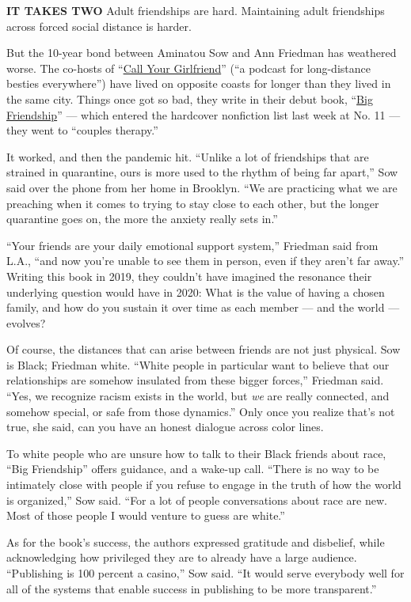 \textbf{IT TAKES TWO} Adult friendships are hard. Maintaining adult
friendships across forced social distance is harder.

But the 10-year bond between Aminatou Sow and Ann Friedman has weathered
worse. The co-hosts of ``\href{https://www.callyourgirlfriend.com/}{Call
Your Girlfriend}'' (``a podcast for long-distance besties everywhere'')
have lived on opposite coasts for longer than they lived in the same
city. Things once got so bad, they write in their debut book,
``\href{https://www.nytimes3xbfgragh.onion/2020/07/10/books/review/big-friendship-aminatou-sow-ann-friedman.html}{Big
Friendship}'' --- which entered the hardcover nonfiction list last week
at No. 11 --- they went to ``couples therapy.''

It worked, and then the pandemic hit. ``Unlike a lot of friendships that
are strained in quarantine, ours is more used to the rhythm of being far
apart,'' Sow said over the phone from her home in Brooklyn. ``We are
practicing what we are preaching when it comes to trying to stay close
to each other, but the longer quarantine goes on, the more the anxiety
really sets in.''

``Your friends are your daily emotional support system,'' Friedman said
from L.A., ``and now you're unable to see them in person, even if they
aren't far away.'' Writing this book in 2019, they couldn't have
imagined the resonance their underlying question would have in 2020:
What is the value of having a chosen family, and how do you sustain it
over time as each member --- and the world --- evolves?

Of course, the distances that can arise between friends are not just
physical. Sow is Black; Friedman white. ``White people in particular
want to believe that our relationships are somehow insulated from these
bigger forces,'' Friedman said. ``Yes, we recognize racism exists in the
world, but \emph{we} are really connected, and somehow special, or safe
from those dynamics.'' Only once you realize that's not true, she said,
can you have an honest dialogue across color lines.

To white people who are unsure how to talk to their Black friends about
race, ``Big Friendship'' offers guidance, and a wake-up call. ``There is
no way to be intimately close with people if you refuse to engage in the
truth of how the world is organized,'' Sow said. ``For a lot of people
conversations about race are new. Most of those people I would venture
to guess are white.''

As for the book's success, the authors expressed gratitude and
disbelief, while acknowledging how privileged they are to already have a
large audience. ``Publishing is 100 percent a casino,'' Sow said. ``It
would serve everybody well for all of the systems that enable success in
publishing to be more transparent.''

